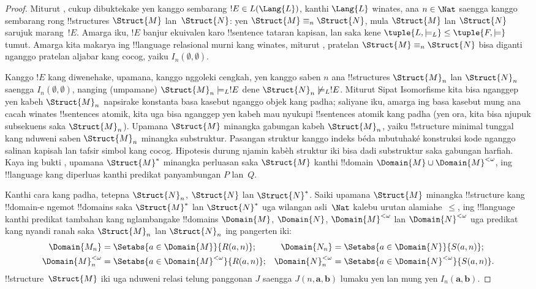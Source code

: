 \documentclass[../../../include/open-logic-section]{subfiles}
\begin{document}
\begin{proof}
Miturut , cukup dibuktekake yen kanggo sembarang
$!E \in L(\Lang{L})$, kanthi $\Lang{L}$ winates, ana $n \in \Nat$
saengga kanggo sembarang rong !!{structure}s $\Struct{M}$
lan~$\Struct{N}$: yen $\Struct{M} \equiv_n \Struct{N}$, mula
$\Struct{M}$ lan $\Struct{N}$ sarujuk marang~$!E$. Amarga iku,
$!E$ banjur ekuivalen karo !!{sentence} tataran kapisan, lan saka
kene $\tuple{L, \models_L} \le \tuple{F, \models}$ tumut.
Amarga kita makarya ing !!{language} relasional murni kang winates,
miturut , pratelan
$\Struct{M} \equiv_n \Struct{N}$ bisa diganti nganggo pratelan
aljabar kang cocog, yaiku $I_n(\emptyset,\emptyset)$.

Kanggo $!E$ kang diwenehake, upamana, kanggo nggoleki cengkah,
yen kanggo saben $n$ ana !!{structure}s $\Struct{M}_n$ lan
$\Struct{N}_n$ saengga $I_n(\emptyset, \emptyset)$,
nanging (umpamane) $\Struct{M}_n \models_L !E$ dene
$\Struct{N}_n \not\models_L !E$. Miturut Sipat Isomorfisme
kita bisa nganggep yen kabeh $\Struct{M}_n$ napsirake konstanta
basa kasebut nganggo objek kang padha; saliyane iku, amarga
ing basa kasebut mung ana cacah winates !!{sentence}s atomik,
kita uga bisa nganggep yen kabeh mau nyukupi !!{sentence}s
atomik kang padha (yen ora, kita bisa njupuk subsekuens saka
$\Struct{M}_n$). Upamana $\Struct{M}$ minangka gabungan kabeh
$\Struct{M}_n$, yaiku !!{structure} minimal tunggal kang
nduweni saben $\Struct{M}_n$ minangka substruktur. Pasangan struktur kanggo indeks béda mbutuhaké konstruksi kode nganggo salinan kapisah lan tafsir simbol kang cocog. Hipotesis durung njamin kabèh struktur iki bisa dadi substruktur saka gabungan harfiah. Kaya ing
bukti , upamana
$\Struct{M}^*$ minangka perluasan saka $\Struct{M}$ kanthi
!!{domain} $\Domain{M} \cup
\Domain{M}^{<\omega}$, ing !!{language} kang diperluas
kanthi predikat panyambungan $P$ lan~$Q$.

Kanthi cara kang padha, tetepna $\Struct{N}_n$, $\Struct{N}$
lan $\Struct{N}^*$. Saiki upamana $\Struct{M}$ minangka
!!{structure} kang !!{domain}-e ngemot !!{domain}s saka
$\Struct{M}^*$ lan $\Struct{N}^*$ uga wilangan asli~$\Nat$
kalebu urutan alamiahe~$\le$, ing !!{language} kanthi predikat
tambahan kang nglambangake !!{domain}s
$\Domain{M}$, $\Domain{N}$, $\Domain{M}^{<\omega}$ lan
$\Domain{N}^{<\omega}$ uga predikat kang nyandi ranah saka
$\Struct{M}_n$ lan $\Struct{N}_n$ ing pangerten iki:
\begin{align*}
  \Domain{M_n} & = \Setabs{a \in \Domain{M}}{R(a, n)}; &
  \Domain{N_n} & = \Setabs{a \in \Domain{N}}{S(a,n)}; \\
  \Domain{M}^{<\omega}_n & = \Setabs{a \in \Domain{M}^{<\omega}}{R(a,n)}; &
  \Domain{N}^{<\omega}_n & = \Setabs{a \in \Domain{N}^{<\omega}}{S(a,n)}.
\end{align*}
!!{structure}~$\Struct{M}$ iki uga nduweni relasi telung panggonan
$J$ saengga $J(n, \mathbf{a}, \mathbf{b})$ lumaku yen lan mung
yen $I_n(\mathbf{a}, \mathbf{b})$.


\end{proof}
\end{document}
